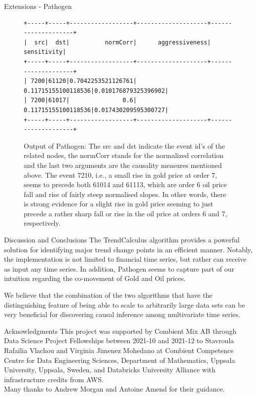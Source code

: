 \documentclass[final]{beamer}
\newlength{\colwidth}
\begin{document}
\begin{frame}[fragile]
\begin{columns}[t]
\begin{column}{\colwidth}
\begin{block}{Extensions - Pathogen}
\begin{itemize}
\begin{itemize}
        \end{itemize}   
    \end{itemize}
\vspace*{-0.3in}
\begin{figure}
\begin{BVerbatim}[fontsize=\small]
+-----+-----+------------------+--------------------+--------------------+
|  src|  dst|          normCorr|      aggressiveness|         sensitivity|
+-----+-----+------------------+--------------------+--------------------+
| 7200|61120|0.7042253521126761| 0.11715155100118536|0.010176879325396902|
| 7200|61017|               0.6| 0.11715155100118536|0.017430209595300727|
+-----+-----+------------------+--------------------+--------------------+
\end{BVerbatim}
\caption{Output of Pathogen: The src and dst indicate the event id's of the related nodes, the normCorr stands for the normalized correlation and the last two arguments are the causality measures mentioned above. The event 7210, i.e., a small rise in gold price at order 7, seems to precede both 61014 and 61113, which are order 6 oil price fall and rise of fairly steep normalised slopes. In other words, there is strong evidence for a slight rise in gold price seeming to just precede a rather sharp fall or rise in the oil price at orders 6 and 7, respectively.
}
\label{fig:data_pathogen}
\end{figure}
\end{block}

\begin{block}{Discussion and Conclusions}
    The TrendCalculus algorithm provides a  powerful solution for identifying major trend change points in an efficient manner.
    Notably, the implementation is not limited to financial time series, but rather can receive as input any time series. In addition, Pathogen seems to capture part of our intuition regarding the co-movement of Gold and Oil prices.
    
    We believe that the combination of the two algorithms that have the distinguishing feature of being able to scale to arbitrarily large data sets can be very beneficial for discovering causal inference among multivariate time series.  
\end{block}



\begin{block}{Acknowledgments}
\fontsize{20}{10}\selectfont This project was supported by Combient Mix AB through Data Science Project Fellowships between 2021-10 and 2021-12 to Stavroula Rafailia Vlachou and Virginia Jimenez Mohedano at Combient Competence Centre for Data Engineering Sciences, Department of Mathematics, Uppsala University, Uppsala, Sweden, and Databricks University Alliance with infrastructure credits from AWS.\\
Many thanks to Andrew Morgan and Antoine Amend for their guidance.
\end{block}



\end{column}
\end{columns}
\end{frame}
\end{document}
